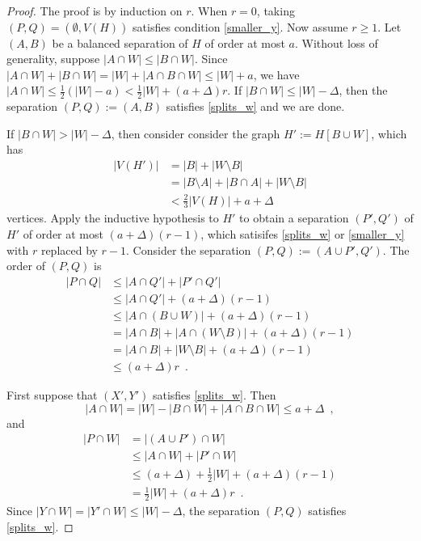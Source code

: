 \documentclass{patmorin}
\begin{document}
\begin{proof}
  The proof is by induction on $r$. When $r=0$, taking $(P,Q)=(\emptyset,V(H))$ satisfies condition \cref{smaller_y}.  Now assume $r\ge 1$.  Let $(A,B)$ be a balanced separation of $H$ of order at most $a$.  Without loss of generality, suppose $|A\cap W|\le |B\cap W|$.  Since $|A\cap W|+|B\cap W|= |W|+|A\cap B\cap W|\le |W|+a$, we have $|A\cap W|\le \tfrac{1}{2}(|W|-a)<\tfrac{1}{2}|W|+(a+\Delta)r$.  If $|B\cap W|\le |W|-\Delta$, then the separation $(P,Q):=(A,B)$ satisfies \cref{splits_w} and we are done.

  If $|B\cap W|>|W|-\Delta$, then consider consider the graph $H':=H[B\cup W]$, which has
  \begin{align*}
    |V(H')| & = |B|+|W\setminus B| \\
      & =|B\setminus A|+|B\cap A|+|W\setminus B| \\
      & < \tfrac{2}{3}|V(H)|+a+\Delta
  \end{align*}
  vertices.  Apply the inductive hypothesis to $H'$ to obtain a separation $(P',Q')$ of $H'$ of order at most $(a+\Delta)(r-1)$, which satisifes \cref{splits_w} or \cref{smaller_y} with $r$ replaced by $r-1$.  Consider the separation $(P,Q):=(A\cup P',Q')$. The order of $(P,Q)$ is
  \begin{align*}
    |P\cap Q| & \le |A\cap Q'|+|P'\cap Q'| \\
    & \le |A\cap Q'|+ (a+\Delta)(r-1) \\
    & \le |A\cap (B\cup W)|+(a+\Delta)(r-1)\\
    & = |A\cap B| + |A\cap (W\setminus B)|+(a+\Delta)(r-1)\\
    & = |A\cap B| + |W\setminus B|+(a+\Delta)(r-1)\\
    & \le (a+\Delta)r \enspace .
  \end{align*}

  First suppose that $(X',Y')$ satisfies \cref{splits_w}.  Then
  \[
     |A\cap W| = |W|-|B\cap W|+|A\cap B\cap W|
      \le a+\Delta \enspace ,
  \]
  and
  \begin{align*}
    |P\cap W| & =|(A\cup P')\cap W| \\
     & \le |A\cap W|+|P'\cap W|  \\
     & \le (a+\Delta)+\tfrac{1}{2}|W|+(a+\Delta)(r-1)  \\
    & = \tfrac{1}{2}|W|+(a+\Delta)r \enspace .
  \end{align*}
  Since $|Y\cap W|=|Y'\cap W|\le |W|-\Delta$, the separation $(P,Q)$ satisfies \cref{splits_w}.


\end{proof}
\end{document}

